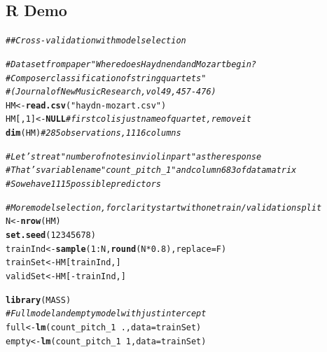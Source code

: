 \documentclass[oneside]{book}\usepackage[]{graphicx}\usepackage[dvipsnames,table,xcdraw]{xcolor}
\makeatletter
\newcommand{\hlnum}[1]{\textcolor[rgb]{0.686,0.059,0.569}{#1}}%
\newcommand{\hlstr}[1]{\textcolor[rgb]{0.192,0.494,0.8}{#1}}%
\newcommand{\hlcom}[1]{\textcolor[rgb]{0.678,0.584,0.686}{\textit{#1}}}%
\newcommand{\hlopt}[1]{\textcolor[rgb]{0,0,0}{#1}}%
\newcommand{\hlstd}[1]{\textcolor[rgb]{0.345,0.345,0.345}{#1}}%
\newcommand{\hlkwa}[1]{\textcolor[rgb]{0.161,0.373,0.58}{\textbf{#1}}}%
\newcommand{\hlkwb}[1]{\textcolor[rgb]{0.69,0.353,0.396}{#1}}%
\newcommand{\hlkwc}[1]{\textcolor[rgb]{0.333,0.667,0.333}{#1}}%
\newcommand{\hlkwd}[1]{\textcolor[rgb]{0.737,0.353,0.396}{\textbf{#1}}}%
\newenvironment{kframe}{%
 \def\at@end@of@kframe{}%
 \ifinner\ifhmode%
  \def\at@end@of@kframe{\end{minipage}}%
  \begin{minipage}{\columnwidth}%
 \fi\fi%
 \def\FrameCommand##1{\hskip\@totalleftmargin \hskip-\fboxsep
 \colorbox{shadecolor}{##1}\hskip-\fboxsep
     \hskip-\linewidth \hskip-\@totalleftmargin \hskip\columnwidth}%
 \MakeFramed {\advance\hsize-\width
   \@totalleftmargin\z@ \linewidth\hsize
   \@setminipage}}%
 {\par\unskip\endMakeFramed%
 \at@end@of@kframe}
\newenvironment{knitrout}{}{} %
\makeatother
\begin{document}
\subsection{R Demo}
\begin{knitrout}
\color{fgcolor}\begin{kframe}
\begin{alltt}
\hlcom{## Cross-validation with model selection}

\hlcom{# Dataset from paper "Where does Haydn end and Mozart begin?}
\hlcom{# Composer classification of string quartets"}
\hlcom{# (Journal of New Music Research, vol 49, 457-476)}
\hlstd{HM} \hlkwb{<-} \hlkwd{read.csv}\hlstd{(}\hlstr{"haydn-mozart.csv"}\hlstd{)}
\hlstd{HM[,}\hlnum{1}\hlstd{]} \hlkwb{<-} \hlkwa{NULL} \hlcom{# first col is just name of quartet, remove it}
\hlkwd{dim}\hlstd{(HM)} \hlcom{# 285 observations, 1116 columns}

\hlcom{# Let's treat "number of notes in violin part" as the response}
\hlcom{# That's variable name "count_pitch_1" and column 683 of data matrix}
\hlcom{# So we have 1115 possible predictors}

\hlcom{# More model selection, for clarity start with one train/validation split}
\hlstd{N} \hlkwb{<-} \hlkwd{nrow}\hlstd{(HM)}
\hlkwd{set.seed}\hlstd{(}\hlnum{12345678}\hlstd{)}
\hlstd{trainInd} \hlkwb{<-} \hlkwd{sample}\hlstd{(}\hlnum{1}\hlopt{:}\hlstd{N,} \hlkwd{round}\hlstd{(N}\hlopt{*}\hlnum{0.8}\hlstd{),} \hlkwc{replace}\hlstd{=F)}
\hlstd{trainSet} \hlkwb{<-} \hlstd{HM[trainInd,]}
\hlstd{validSet} \hlkwb{<-} \hlstd{HM[}\hlopt{-}\hlstd{trainInd,]}

\hlkwd{library}\hlstd{(MASS)}
\hlcom{# Full model and empty model with just intercept}
\hlstd{full} \hlkwb{<-} \hlkwd{lm}\hlstd{(count_pitch_1} \hlopt{~} \hlstd{.,} \hlkwc{data} \hlstd{= trainSet)}
\hlstd{empty} \hlkwb{<-} \hlkwd{lm}\hlstd{(count_pitch_1} \hlopt{~} \hlnum{1}\hlstd{,} \hlkwc{data} \hlstd{=trainSet)}


\end{alltt}
\end{kframe}
\end{knitrout}
\end{document}
